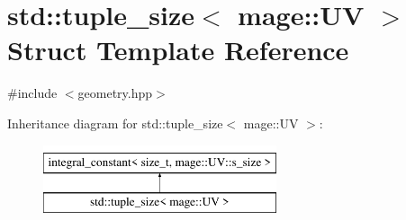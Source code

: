 \hypertarget{structstd_1_1tuple__size_3_01mage_1_1_u_v_01_4}{}\section{std\+:\+:tuple\+\_\+size$<$ mage\+:\+:UV $>$ Struct Template Reference}
\label{structstd_1_1tuple__size_3_01mage_1_1_u_v_01_4}


{\ttfamily \#include $<$geometry.\+hpp$>$}

Inheritance diagram for std\+:\+:tuple\+\_\+size$<$ mage\+:\+:UV $>$\+:\begin{figure}[H]
\begin{center}
\leavevmode
\includegraphics[height=2.000000cm]{structstd_1_1tuple__size_3_01mage_1_1_u_v_01_4}
\end{center}
\end{figure}
